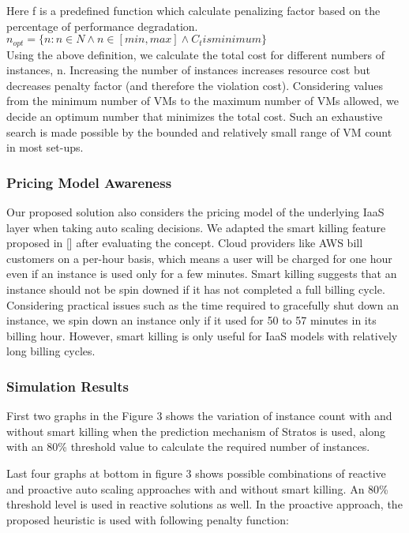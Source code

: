 Here f is a predefined function which calculate penalizing factor based on the percentage of performance degradation. $n_{opt} = \{n: n \in N \land n \in [min, max] \land C_t is minimum\} $
\\

Using the above definition, we calculate the total cost for different numbers of instances, n. Increasing the number of instances increases resource cost but decreases penalty factor (and therefore the violation cost). Considering values from the minimum number of VMs to the maximum number of VMs allowed, we decide an optimum number that minimizes the total cost. Such an exhaustive search is made possible by the bounded and relatively small range of VM count in most set-ups.
\subsubsection {Pricing Model Awareness}

Our proposed solution also considers the pricing model of the underlying IaaS layer when taking auto scaling decisions. We adapted the smart killing feature proposed in [\cite{pluggable}] after evaluating the concept. Cloud providers like AWS bill customers on a per-hour basis, which means a user will be charged for one hour even if an instance is used only for a few minutes. Smart killing suggests that an instance should not be spin downed if it has not completed a full billing cycle. Considering practical issues such as the time required to gracefully shut down an instance, we spin down an instance only if it used for 50 to 57 minutes in its billing hour. However, smart killing is only useful for IaaS models with relatively long billing cycles.

\subsubsection{Simulation Results}
First two graphs in the Figure 3 shows the variation of instance count with and without smart killing when the prediction mechanism of Stratos is used, along with an 80\% threshold value to calculate the required number of instances.

Last four graphs at bottom in figure 3 shows possible combinations of reactive and proactive auto scaling approaches with and without smart killing. An 80\% threshold level is used in reactive solutions as well. In the proactive approach, the proposed heuristic is used with following penalty function:

